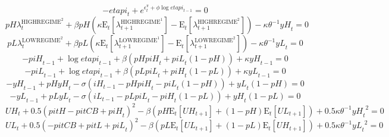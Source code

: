 \begin{equation}
-{e\!t\!a\!p\!i}_{t} + e^{\epsilon^{\pi}_{t} + {\phi} {\log{{e\!t\!a\!p\!i}_{t-1}}}} = 0
\end{equation}
\begin{equation}
{{p\!H}} {\lambda^{\mathrm{HIGHREGIME}^{\mathrm{2}}}_{t}} + {\beta} {{p\!H}} \left({\kappa} {\mathrm{E}_{t}\left[\lambda^{\mathrm{HIGHREGIME}^{\mathrm{1}}}_{t+1}\right]} - \mathrm{E}_{t}\left[\lambda^{\mathrm{HIGHREGIME}^{\mathrm{2}}}_{t+1}\right]\right) - {\kappa} {\theta}^{-1} {{y\!H}_{t}} = 0
\end{equation}
\begin{equation}
{{p\!L}} {\lambda^{\mathrm{LOWREGIME}^{\mathrm{2}}}_{t}} + {\beta} {{p\!L}} \left({\kappa} {\mathrm{E}_{t}\left[\lambda^{\mathrm{LOWREGIME}^{\mathrm{1}}}_{t+1}\right]} - \mathrm{E}_{t}\left[\lambda^{\mathrm{LOWREGIME}^{\mathrm{2}}}_{t+1}\right]\right) - {\kappa} {\theta}^{-1} {{y\!L}_{t}} = 0
\end{equation}
\begin{equation}
-{p\!i\!H}_{t-1} + \log{{e\!t\!a\!p\!i}_{t-1}} + {\beta} \left({{p\!H}} {{p\!i\!H}_{t}} + {{p\!i\!L}_{t}} \left(1 - {p\!H}\right)\right) + {\kappa} {{y\!H}_{t-1}} = 0
\end{equation}
\begin{equation}
-{p\!i\!L}_{t-1} + \log{{e\!t\!a\!p\!i}_{t-1}} + {\beta} \left({{p\!L}} {{p\!i\!L}_{t}} + {{p\!i\!H}_{t}} \left(1 - {p\!L}\right)\right) + {\kappa} {{y\!L}_{t-1}} = 0
\end{equation}
\begin{equation}
-{y\!H}_{t-1} + {{p\!H}} {{y\!H}_{t}} - {\sigma} \left({i\!H}_{t-1} - {{p\!H}} {{p\!i\!H}_{t}} - {{p\!i\!L}_{t}} \left(1 - {p\!H}\right)\right) + {{y\!L}_{t}} \left(1 - {p\!H}\right) = 0
\end{equation}
\begin{equation}
-{y\!L}_{t-1} + {{p\!L}} {{y\!L}_{t}} - {\sigma} \left({i\!L}_{t-1} - {{p\!L}} {{p\!i\!L}_{t}} - {{p\!i\!H}_{t}} \left(1 - {p\!L}\right)\right) + {{y\!H}_{t}} \left(1 - {p\!L}\right) = 0
\end{equation}
\begin{equation}
{U\!H}_{t} + 0.5\left({p\!i\!t\!H} - {p\!i\!t\!C\!B} + {p\!i\!H}_{t}\right)^{2} - {\beta} \left({{p\!H}} {\mathrm{E}_{t}\left[{U\!H}_{t+1}\right]} + \left(1 - {p\!H}\right) {\mathrm{E}_{t}\left[{U\!L}_{t+1}\right]}\right) + 0.5{\kappa} {\theta}^{-1} {{y\!H}_{t}}^{2} = 0
\end{equation}
\begin{equation}
{U\!L}_{t} + 0.5\left(-{p\!i\!t\!C\!B} + {p\!i\!t\!L} + {p\!i\!L}_{t}\right)^{2} - {\beta} \left({{p\!L}} {\mathrm{E}_{t}\left[{U\!L}_{t+1}\right]} + \left(1 - {p\!L}\right) {\mathrm{E}_{t}\left[{U\!H}_{t+1}\right]}\right) + 0.5{\kappa} {\theta}^{-1} {{y\!L}_{t}}^{2} = 0
\end{equation}
